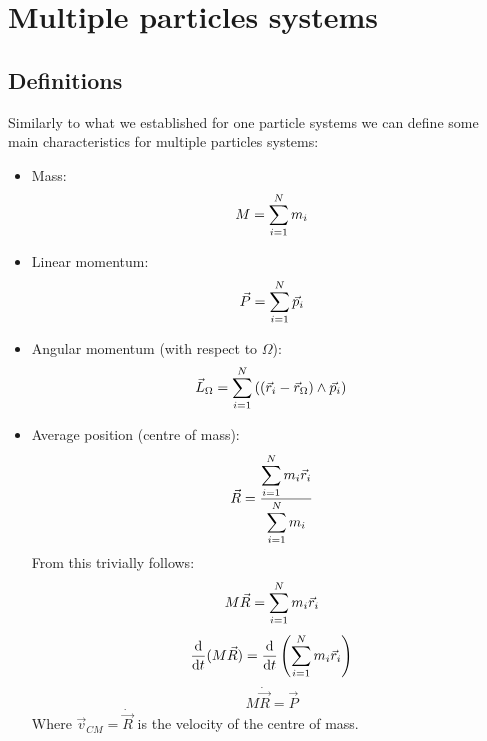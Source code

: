 \section{Multiple particles systems}
\subsection{Definitions}
Similarly to what we established for one particle systems we can define some main characteristics for multiple particles systems:
\begin{itemize}
    \item Mass:\begin{equation}
        M = \displaystyle\sum_{i=1}^{N} m_i
    \end{equation}
    \item Linear momentum:\begin{equation}
        \vec{P} = \displaystyle\sum_{i=1}^{N} \vec{p}_i
    \end{equation}
    \item Angular momentum (with respect to $\Omega$):\begin{equation}
        \vec{L}_{\Omega} = \displaystyle\sum_{i=1}^{N} \left(\left(\vec{r}_i-\vec{r}_{\Omega}\right) \wedge \vec{p}_i\right)
    \end{equation}
    \item Average position (centre of mass): \begin{equation} \label{e:centre_of_mass}
        \vec{R} = \dfrac{\displaystyle\sum_{i=1}^{N}m_i\vec{r}_i}{\displaystyle\sum_{i=1}^{N}m_i}
    \end{equation}
    From this trivially follows:
    \begin{equation}
        M \vec{R} = \displaystyle\sum_{i=1}^{N}m_i\vec{r}_i
    \end{equation}
    \begin{equation}
        \dfrac{\mathrm{d}}{\mathrm{d}t}(M \vec{R}) = \dfrac{\mathrm{d}}{\mathrm{d}t}\left(\displaystyle\sum_{i=1}^{N}m_i\vec{r}_i\right)
    \end{equation}
    \begin{equation}
        M \dot{\vec{R}} = \vec{P}
    \end{equation}
    Where $\vec{v}_{CM} = \dot{\vec{R}}$ is the velocity of the centre of mass.
\end{itemize}
